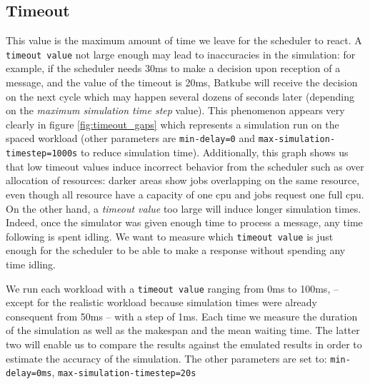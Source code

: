 \subsection{Timeout}

This value is the maximum amount of time we leave for the scheduler to react. A
\texttt{timeout value} not large enough may lead to inaccuracies in the
simulation: for example, if the scheduler needs 30ms to make a decision upon
reception of a message, and the value of the timeout is 20ms, Batkube will
receive the decision on the next cycle which may happen several dozens of
seconds later (depending on the \textit{maximum simulation time step} value).
This phenomenon appears very clearly in figure \ref{fig:timeout_gaps} which
represents a simulation run on the spaced workload (other parameters are
\texttt{min-delay=0} and \texttt{max-simulation-timestep=1000s} to reduce
simulation time). Additionally, this graph shows us that low timeout values
induce incorrect behavior from the scheduler such as over allocation of
resources: darker areas show jobs overlapping on the same resource, even though
all resource have a capacity of one cpu and jobs request one full cpu.  On the
other hand, a \textit{timeout value} too large will induce longer simulation
times. Indeed, once the simulator was given enough time to process a message,
any time following is spent idling. We want to measure which \texttt{timeout
value} is just enough for the scheduler to be able to make a response without
spending any time idling.

We run each workload with a \texttt{timeout value} ranging from 0ms to 100ms,
--except for the realistic workload because simulation times were already
consequent from 50ms -- with a step of 1ms. Each time we measure the duration
of the simulation as well as the makespan and the mean waiting time. The latter
two will enable us to compare the results against the emulated results in order
to estimate the accuracy of the simulation. The other parameters are set to:
\texttt{min-delay=0ms}, \texttt{max-simulation-timestep=20s}

